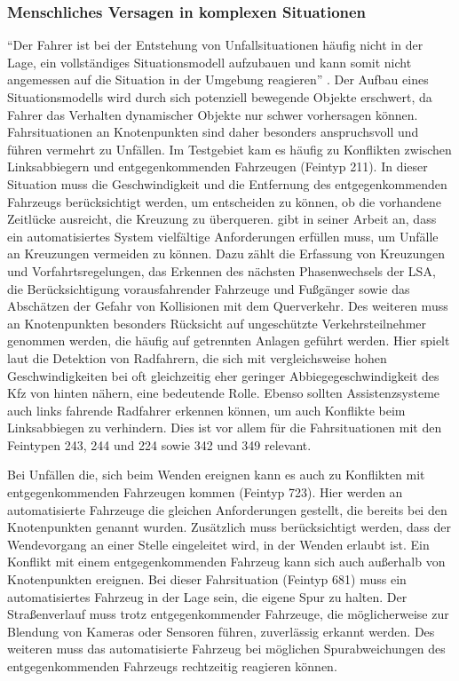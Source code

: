 \subsubsection{Menschliches Versagen in komplexen Situationen}
\enquote{Der Fahrer ist bei der Entstehung von Unfallsituationen häufig nicht in der Lage, ein vollständiges Situationsmodell aufzubauen und kann somit nicht angemessen auf die Situation in der Umgebung reagieren} \parencite[S. 48]{Zademach.24.09.2015}. Der Aufbau eines Situationsmodells wird durch sich potenziell bewegende Objekte erschwert, da Fahrer das Verhalten dynamischer Objekte nur schwer vorhersagen können. Fahrsituationen an Knotenpunkten sind daher besonders anspruchsvoll und führen vermehrt zu Unfällen. Im Testgebiet kam es häufig zu Konflikten zwischen Linksabbiegern und entgegenkommenden Fahrzeugen (Feintyp 211). In dieser Situation muss die Geschwindigkeit und die Entfernung des entgegenkommenden Fahrzeugs berücksichtigt werden, um entscheiden zu können, ob die vorhandene Zeitlücke ausreicht, die Kreuzung zu überqueren. \Textcite[S. 9]{Mages.2008} gibt in seiner Arbeit an, dass ein automatisiertes System vielfältige Anforderungen erfüllen muss, um Unfälle an Kreuzungen vermeiden zu können. Dazu zählt die Erfassung von Kreuzungen und Vorfahrtsregelungen, das Erkennen des nächsten Phasenwechsels der \ac{LSA}, die Berücksichtigung vorausfahrender Fahrzeuge und Fußgänger sowie das Abschätzen der Gefahr von Kollisionen mit dem Querverkehr. Des weiteren muss an Knotenpunkten besonders Rücksicht auf ungeschützte Verkehrsteilnehmer genommen werden, die häufig auf getrennten Anlagen geführt werden. Hier spielt laut \Textcite[S. 310]{Schreiber.2014b} die Detektion von Radfahrern, die sich mit vergleichsweise hohen Geschwindigkeiten bei oft gleichzeitig eher geringer Abbiegegeschwindigkeit des Kfz von hinten nähern, eine bedeutende Rolle. Ebenso sollten Assistenzsysteme auch links fahrende Radfahrer erkennen können, um auch Konflikte beim Linksabbiegen zu verhindern. Dies ist vor allem für die Fahrsituationen mit den Feintypen 243, 244 und 224 sowie 342 und 349 relevant.

Bei Unfällen die, sich beim Wenden ereignen kann es auch zu Konflikten mit entgegenkommenden Fahrzeugen kommen (Feintyp 723). Hier werden an automatisierte Fahrzeuge die gleichen Anforderungen gestellt, die bereits bei den Knotenpunkten genannt wurden. Zusätzlich muss berücksichtigt werden, dass der Wendevorgang an einer Stelle eingeleitet wird, in der Wenden erlaubt ist. Ein Konflikt mit einem entgegenkommenden Fahrzeug kann sich auch außerhalb von Knotenpunkten ereignen. Bei dieser Fahrsituation (Feintyp 681) muss ein automatisiertes Fahrzeug in der Lage sein, die eigene Spur zu halten. Der Straßenverlauf muss trotz entgegenkommender Fahrzeuge, die möglicherweise zur Blendung von Kameras oder Sensoren führen, zuverlässig erkannt werden. Des weiteren muss das automatisierte Fahrzeug bei möglichen Spurabweichungen des entgegenkommenden Fahrzeugs rechtzeitig reagieren können.

